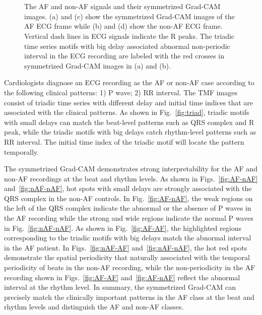 \documentclass[journal]{IEEEtran}
\begin{document}
\begin{figure*}[th]
  \centering
  \\  
  \\ 
  \caption{The AF and non-AF signals and their symmetrized Grad-CAM images. (a) and (c) show the symmetrized Grad-CAM images of the AF ECG frame while (b) and (d) show the non-AF ECG frame. Vertical dash lines in ECG signals indicate the R peaks. The triadic time series motifs with big delay associated abnormal non-periodic interval in the ECG recording are labeled with the red crosses in symmetrized Grad-CAM images in (a) and (b).} \label{fig:localization:AF}
\end{figure*}

Cardiologists diagnose an ECG recording as the AF or non-AF case according to the following clinical patterns: 1) P wave; 2) RR interval. 
The TMF images consist of triadic time series with different delay and initial time indices that are associated with the clinical patterns. As shown in Fig.~\ref{fig:triad}, triadic motifs with small delays can match the beat-level patterns such as QRS complex and R peak, while the triadic motifs with big delays catch rhythm-level patterns such as RR interval. The initial time index of the triadic motif will locate the pattern temporally.

The symmetrized Grad-CAM demonstrates strong interpretability for the AF and non-AF recordings at the beat and rhythm levels. 
As shown in Figs.~\ref{fig:AF-nAF} and~\ref{fig:nAF-nAF}, hot spots with small delays are strongly associated with the QRS complex in the non-AF controls. In Fig.~\ref{fig:AF-nAF}, the weak regions on the left of the QRS complex indicate the abnormal or the absence of P waves in the AF recording while the strong and wide regions indicate the normal P waves in Fig.~\ref{fig:nAF-nAF}.
As shown in Fig.~\ref{fig:AF-AF}, the highlighted regions corresponding to the triadic motifs with big delays match the abnormal interval in the AF patient. 
In Figs.~\ref{fig:nAF-AF} and~\ref{fig:nAF-nAF}, the hot red spots demonstrate the spatial periodicity that naturally associated with the temporal periodicity of beats in the non-AF recording, while the non-periodicity in the AF recording shown in Figs.~\ref{fig:AF-AF} and~\ref{fig:AF-nAF} reflect the abnormal interval at the rhythm level. 
In summary, the symmetrized Grad-CAM can precisely match the clinically important patterns in the AF class at the beat and rhythm levels and distinguish the AF and non-AF classes.
\end{document}
